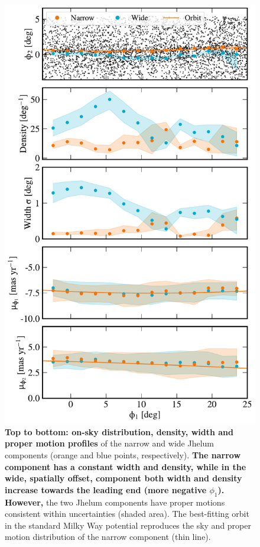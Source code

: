 \documentclass[twocolumn]{aastex62}
\newcommand{\changes}[1]{{\textbf{#1}}}
\begin{document}
\begin{figure}
\begin{center}
\includegraphics[width=\columnwidth]{components.pdf}
\end{center}
\caption{
\changes{Top to bottom: on-sky distribution, density, width and proper motion profiles} of the narrow and wide Jhelum components (orange and blue points, respectively).
\changes{The narrow component has a constant width and density, while in the wide, spatially offset, component both width and density increase towards the leading end (more negative $\phi_1$).}
\changes{However,} the two Jhelum components have proper motions consistent within uncertainties (shaded area).
The best-fitting orbit in the standard Milky Way potential reproduces the sky and proper motion distribution of the narrow component (thin line).
}
\label{fig:components}
\end{figure}
\end{document}
